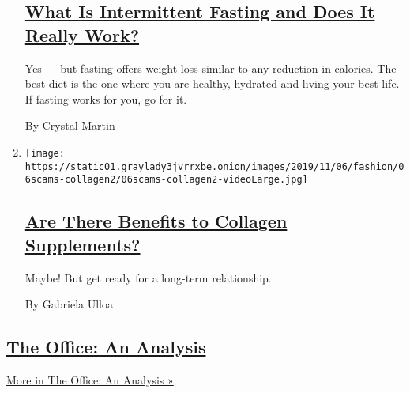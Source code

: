 \begin{enumerate}
  \hypertarget{what-is-intermittent-fasting-and-does-it-really-work}{%
  \subsection{\texorpdfstring{\href{/2019/11/23/style/self-care/intermittent-fasting-benefits.html}{What
  Is Intermittent Fasting and Does It Really
  Work?}}{What Is Intermittent Fasting and Does It Really Work?}}\label{what-is-intermittent-fasting-and-does-it-really-work}}

  Yes --- but fasting offers weight loss similar to any reduction in
  calories. The best diet is the one where you are healthy, hydrated and
  living your best life. If fasting works for you, go for it.

  By Crystal Martin
\item
  \texttt{[image: https://static01.graylady3jvrrxbe.onion/images/2019/11/06/fashion/06scams-collagen2/06scams-collagen2-videoLarge.jpg]}

  \hypertarget{are-there-benefits-to-collagen-supplements}{%
  \subsection{\texorpdfstring{\href{/2019/11/09/style/self-care/collagen-benefits.html}{Are
  There Benefits to Collagen
  Supplements?}}{Are There Benefits to Collagen Supplements?}}\label{are-there-benefits-to-collagen-supplements}}

  Maybe! But get ready for a long-term relationship.

  By Gabriela Ulloa
\end{enumerate}

\hypertarget{the-office-an-analysis}{%
\subsection{\texorpdfstring{\href{/spotlight/the-office-an-analysis}{The
Office: An
Analysis}}{The Office: An Analysis}}\label{the-office-an-analysis}}

\href{/spotlight/the-office-an-analysis}{More in The Office: An Analysis
»}

